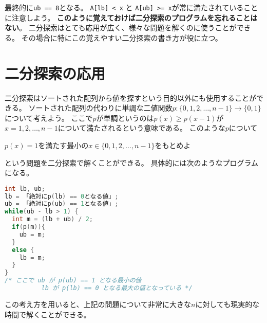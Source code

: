 \documentclass[a4paper,twoside,onecolumn,openany,article,10pt]{memoir}
\theoremstyle{remark}
\begin{document}
\begin{center}
\end{center}

最終的に\texttt{ub == 8}となる。
\texttt{A[lb] < x} と \texttt{A[ub] >= x}が常に満たされていることに注意しよう。
\textbf{このように覚えておけば二分探索のプログラムを忘れることはない}。
二分探索はとても応用が広く、様々な問題を解くのに使うことができる。
その場合に特にこの覚えやすい二分探索の書き方が役に立つ。


\section{二分探索の応用}
二分探索はソートされた配列から値を探すという目的以外にも使用することができる。
ソートされた配列の代わりに単調な二値関数$p\colon \{0,1,2,\dotsc,n-1\}\to\{0,1\}$について考えよう。
ここで$p$が単調というのは$p(x)\ge p(x-1)$が$x=1,2,\dotsc,n-1$について満たされるという意味である。
このような$p$について
\begin{center}
$p(x) = 1$を満たす最小の$x\in\{0,1,2,\dotsc,n-1\}$をもとめよ
\end{center}
という問題を二分探索で解くことができる。
具体的には次のようなプログラムになる。
\begin{lstlisting}[basicstyle=\ttfamily\normalsize,showstringspaces=false,language=C,frame=single]
int lb, ub;
lb = 「絶対にp(lb) == 0となる値」;
ub = 「絶対にp(ub) == 1となる値」;
while(ub - lb > 1) {
  int m = (lb + ub) / 2;
  if(p(m)){
    ub = m;
  }
  else {
    lb = m;
  }
}
/* ここで ub が p(ub) == 1 となる最小の値
          lb が p(lb) == 0 となる最大の値となっている */
\end{lstlisting}
この考え方を用いると、上記の問題について非常に大きな$n$に対しても現実的な時間で解くことができる。
\end{document}
